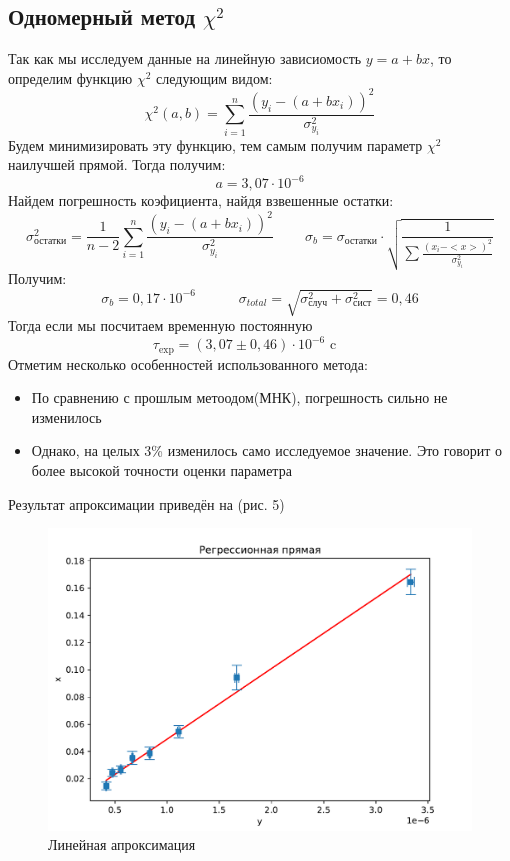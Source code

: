 \documentclass[a4paper,20pt]{article}
\theoremstyle{definition}
\begin{document}
\subsection{Одномерный метод $\chi^2$}
Так как мы исследуем данные на линейную зависиомость $y = a + bx$, то определим функцию $\chi^2$ следующим видом:
\begin{equation}
	\chi^2(a, b) = \sum_{i=1}^{n} \frac{(y_i-(a+bx_i))^2}{\sigma^2_{y_i}}
\end{equation}
Будем минимизировать эту функцию, тем самым получим параметр $\chi^2$ наилучшей прямой. Тогда получим:
\begin{equation}
	a = 3,07\cdot10^{-6} 
\end{equation}
Найдем погрешность коэфициента, найдя взвешенные остатки:
\begin{equation}
	\sigma_{\text{остатки}}^2 = \frac{1}{n-2} \sum_{i=1}^{n}\frac{(y_i-(a+bx_i))^2}{\sigma^2_{y_i}} \;\;\;\;\;\;\;\; \sigma_b = \sigma_{\text{остатки}}\cdot \sqrt{\frac{1}{\sum \frac{(x_i-<x>)^2}{\sigma_{y_i}^2}}}
\end{equation}
Получим:
\begin{equation}
	\sigma_b = 0,17 \cdot10^{-6} \;\;\;\;\;\;\;\;\;\;\; \sigma_{total} = \sqrt{\sigma_{\text{случ}}^2 + \sigma_{\text{сист}}^2} = 0,46
\end{equation}
Тогда если мы посчитаем временную постоянную
\begin{equation}
	\tau_{\text{exp}} = (3,07 \pm 0,46 )\cdot10^{-6} \text{     c} \;\;\;\;\;\;\;\; 
\end{equation}
Отметим несколько особенностей использованного метода:
\begin{itemize}
	\item По сравнению с прошлым метоодом(МНК), погрешность сильно не изменилось
	\item Однако, на целых 3\% изменилось само исследуемое значение. Это говорит о более высокой точности оценки параметра 
\end{itemize}
Результат апроксимации приведён на (рис. 5)
\begin{figure}[h!]
    \centering
    \includegraphics[width=0.7\linewidth]{tau_graph.pdf}
    \caption{Линейная апроксимация}    
\end{figure}
\end{document}
